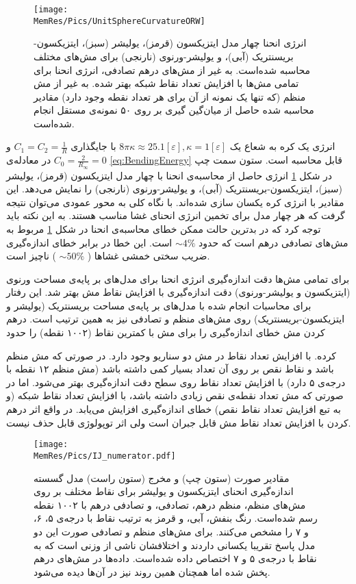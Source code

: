 \begin{figure}[tbhp]
\begin{center}
\texttt{[image: \\MemRes/Pics/UnitSphereCurvatureORW]}
\caption{
انرژی انحنا چهار مدل ایتزیکسون (قرمز)، یولیشر (سبز)، ایتزیکسون-بریسنتریک (آبی)، و یولیشر-ورنوی (نارنجی) برای مش‌های مختلف محاسبه شده‌است. به غیر از مش‌های درهم تصادفی، انرژی انحنا برای تمامی مش‌ها با افزایش تعداد نقاط شبکه بهتر شده. به غیر از مش منظم (که تنها یک نمونه از آن برای هر تعداد نقطه وجود دارد) مقادیر محاسبه شده حاصل از میان‌گین گیری بر روی ۵۰ نمونه‌ی مستقل انجام شده‌است.
}
\label{fig:unitsphereBending}
\end{center}
\end{figure}
انرژی یک کره‌ به شعاع یک 
$8\pi\kappa\approx 25.1[\varepsilon],\kappa=1[\varepsilon]$
با جایگذاری 
$C_1=C_2=\frac{1}{R}$
و
$C_0=\frac{2}{R_\infty}=0$
در معادله‌ی 
\ref{eq:BendingEnergy}
قابل محاسبه‌ است. ستون سمت چپ در شکل 
\ref{fig:unitsphereBending}
انرژی حاصل از محاسبه‌ی انحنا با چهار مدل ایتزیکسون (قرمز)، یولیشر (سبز)، ایتزیکسون-بریسنتریک (آبی)، و یولیشر-ورنوی (نارنجی) را نمایش می‌دهد. این مقادیر با انرژی کره یکسان سازی شده‌اند. با نگاه کلی به محور عمودی می‌توان نتیجه گرفت که هر چهار مدل برای تخمین انرژی انحنای غشا مناسب هستند. به این نکته باید توجه کرد که در بدترین حالت ممکن خطای محاسبه‌ی انحنا در شکل 
\ref{fig:unitsphereBending}
مربوط به مش‌های تصادفی درهم است که حدود
$\sim4\%$
است. این خطا در برابر خطای اندازه‌گیری ضریب سختی خمشی غشا‌ها (
$\sim50\%$
) ناچیز است.

برای تمامی مش‌ها دقت اندازه‌گیری انرژی انحنا برای مدل‌های بر پایه‌ی مساحت ورنوی (ایتزیکسون و یولیشر-ورنوی) دقت اندازه‌گیری با افزایش نقاط مش بهتر شد. این رفتار برای محاسبات انجام شده با مدل‌های بر پایه‌ی مساحت بریسنتریک (یولیشر و ایتزیکسون-بریسنتریک) روی مش‌های منظم و تصادفی نیز به همین ترتیب است. درهم کردن مش خطای اندازه‌‌گیری را برای مش با کمترین نقاط (۱۰۰۲ نقطه) را حدود 

کرده. با افزایش تعداد نقاط در مش دو سناریو وجود دارد. در صورتی که مش‌ منظم باشد و نقاط نقص بر روی آن تعداد بسیار کمی داشته باشد (مش منظم ۱۲ نقطه با درجه‌ی ۵ دارد) با افزایش تعداد نقاط روی سطح دقت اندازه‌گیری بهتر می‌شود. اما در صورتی که مش تعداد نقطه‌ی نقص زیادی داشته باشد، با افزایش تعداد نقاط شبکه (و به تبع افزایش تعداد نقاط نقص) خطای اندازه‌گیری افزایش می‌یابد. در واقع اثر درهم کردن با افزایش تعداد نقاط مش قابل جبران است ولی اثر توپولوژی قابل حذف نیست.

\begin{figure}[tbhp]
\begin{center}
\texttt{[image: \\MemRes/Pics/IJ\_numerator.pdf]}
\caption{
مقادیر صورت (ستون چپ) و مخرج (ستون راست) مدل گسسته اندازه‌گیری انحنای ایتزیکسون و یولیشر برای نقاط مختلف بر روی مش‌های منظم، منظم درهم، تصادفی، و تصادفی درهم با ۱۰۰۲ نقطه رسم شده‌است. رنگ بنفش، آبی، و قرمز به ترتیب  نقاط با درجه‌ی ۵، ۶، و ۷ را مشخص می‌کنند. برای مش‌های منظم و تصادفی صورت این دو مدل پاسخ تقریبا یکسانی داردند و اختلافشان ناشی از وزنی است که به نقاط با درجه‌ی ۵ و ۷ اختصاص داده شده‌است. داده‌ها در مش‌های درهم پخش شده اما همچنان همین روند نیز در آن‌ها دیده می‌شود.
}
\label{fig:unitsphereBendingScatter}
\end{center}
\end{figure}

